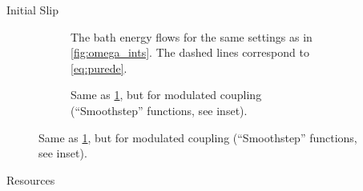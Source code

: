 \documentclass[draft]{beamer}
\newlength{\sepwidth}
\newlength{\colwidth}
\newcommand{\separatorcolumn}{\begin{column}{\sepwidth}\end{column}}
\begin{document}
\begin{frame}[t]
\begin{columns}[t]
\begin{column}{\colwidth}
\begin{block}{Initial Slip}
\begin{itemize}
    \end{itemize}
    \begin{figure}[H]
      \centering
      \begin{subfigure}[t]{.49\linewidth}
        \caption{\label{fig:initslipconst}The bath energy flows for the same settings as in
          \cref{fig:omega_ints}. The dashed lines correspond to \cref{eq:purede}.}
      \end{subfigure}
      \begin{subfigure}[t]{.49\linewidth}
        \caption{Same as \cref{fig:initslipconst}, but for modulated
          coupling (``Smoothstep'' functions, see inset).}
      \end{subfigure}
    \end{figure}
  \end{block}
  \begin{block}{Resources}
    \printbibliography
  \end{block}
\end{column}

\separatorcolumn
\end{columns}
\end{frame}
\end{document}
